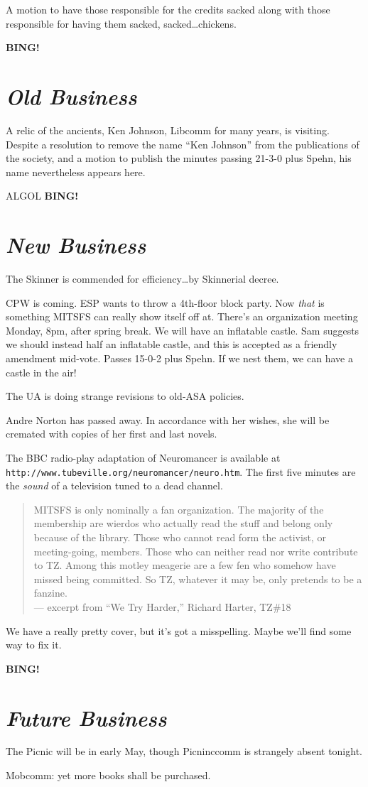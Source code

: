 \documentclass[10pt]{article}
\newcommand{\bing}{{\bf BING!} }
\newcommand{\goto}[1]{\bing \vskip 12pt \section*{{\em{#1}}}}
\newcommand{\ps}{ plus Spehn\xspace}
\begin{document}
A motion to have those responsible for the credits sacked along with
those responsible for having them sacked, sacked\dots chickens.

\goto{Old Business}
A relic of the ancients, Ken Johnson, Libcomm for many years, is
visiting.  Despite a resolution to remove the name ``Ken Johnson''
from the publications of the society, and a motion to publish the
minutes passing 21-3-0\ps, his name nevertheless appears here.

ALGOL
\goto{New Business}
The Skinner is commended for efficiency\dots by Skinnerial decree.

CPW is coming.  ESP wants to throw a 4th-floor block party.  Now
\emph{that} is something MITSFS can really show itself off at.
There's an organization meeting Monday, 8pm, after spring break.  We
will have an inflatable castle.  Sam suggests we should instead half
an inflatable castle, and this is accepted as a friendly amendment
mid-vote.  Passes 15-0-2\ps.  If we nest them, we can have a castle in the air!

The UA is doing strange revisions to old-ASA policies.

Andre Norton has passed away.  In accordance with her wishes, she will
be cremated with copies of her first and last novels.

The BBC radio-play adaptation of Neuromancer is available at
\verb|http://www.tubeville.org/neuromancer/neuro.htm|.  The first five
minutes are the \emph{sound} of a television tuned to a dead channel.

\begin{quotation}
       MITSFS is only nominally a fan organization.  The majority of
       the membership are wierdos who actually read the stuff and belong
       only because of the library.  Those who cannot read form the
       activist, or meeting-going, members.  Those who can neither
       read nor write contribute to TZ.  Among this motley meagerie
       are a few fen who somehow have missed being committed.  So TZ,
       whatever it may be, only pretends to be a fanzine.
       \\ \hfill --- excerpt from ``We Try Harder,'' Richard Harter, TZ\#18
\end{quotation}
We have a really pretty cover, but it's got a misspelling.  Maybe
we'll find some way to fix it.

\goto{Future Business}
The Picnic will be in early May, though Picninccomm is strangely
absent tonight.

Mobcomm: yet more books shall be purchased.
\end{document}
